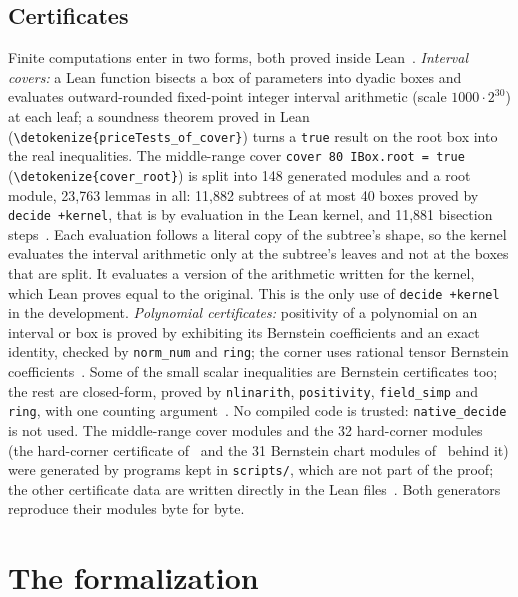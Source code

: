 \documentclass[10pt]{article}
\theoremstyle{definition}
\theoremstyle{remark}
\numberwithin{equation}{section}
\newcommand{\lean}[1]{\texttt{#1}}
\newcommand{\leanid}[1]{\expandafter\nolinkurl\expandafter{\detokenize{#1}}}
\newcommand{\Fm}[1]{\cite[#1]{Formalization}}
\begin{document}
\subsection{Certificates}\label{sec:certs}
Finite computations enter in two forms, both proved inside Lean~\Fm{\S11.1}. \emph{Interval covers:} a Lean function bisects a box of parameters into dyadic boxes and evaluates outward-rounded fixed-point integer interval arithmetic (scale $1000\cdot2^{30}$) at each leaf; a soundness theorem proved in Lean (\leanid{priceTests_of_cover}) turns a \lean{true} result on the root box into the real inequalities. The middle-range cover \lean{cover 80 IBox.root = true} (\leanid{cover_root}) is split into 148 generated modules and a root module, 23,763 lemmas in all: 11,882 subtrees of at most 40 boxes proved by \lean{decide +kernel}, that is by evaluation in the Lean kernel, and 11,881 bisection steps~\Fm{\S11.2}. Each evaluation follows a literal copy of the subtree's shape, so the kernel evaluates the interval arithmetic only at the subtree's leaves and not at the boxes that are split. It evaluates a version of the arithmetic written for the kernel, which Lean proves equal to the original. This is the only use of \lean{decide +kernel} in the development. \emph{Polynomial certificates:} positivity of a polynomial on an interval or box is proved by exhibiting its Bernstein coefficients and an exact identity, checked by \lean{norm\_num} and \lean{ring}; the corner uses rational tensor Bernstein coefficients~\Fm{\S11.3}. Some of the small scalar inequalities are Bernstein certificates too; the rest are closed-form, proved by \lean{nlinarith}, \lean{positivity}, \lean{field\_simp} and \lean{ring}, with one counting argument~\Fm{\S11.4}. No compiled code is trusted: \lean{native\_decide} is not used. The middle-range cover modules and the 32 hard-corner modules (the hard-corner certificate of~\Fm{\S11.3} and the 31 Bernstein chart modules of~\Fm{\S10.6} behind it) were generated by programs kept in \lean{scripts/}, which are not part of the proof; the other certificate data are written directly in the Lean files~\Fm{\S11.5}. Both generators reproduce their modules byte for byte.

\section{The formalization}\label{sec:lean}
\end{document}
